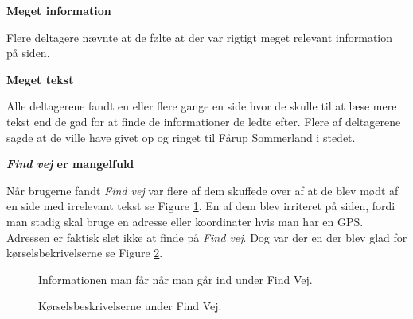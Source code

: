 \documentclass[10pt,a4paper]{article}      %
\newcommand\pic[1]{\texttt{[image: Pics/\#1]}}
\renewcommand\good{\pic{good}}
\renewcommand\smallproblem{\pic{smallproblem}}
\renewcommand\seriousproblem{\pic{seriousproblem}}
\begin{document}
\begin{kommentarer}


\item[\good] \textbf{Meget information}

Flere deltagere nævnte at de følte at der var rigtigt meget relevant information på siden.

\item[\seriousproblem] \textbf{Meget tekst}

Alle deltagerene fandt en eller flere gange en side hvor de skulle til at læse
mere tekst end de gad for at finde de informationer de ledte efter. Flere af
deltagerene sagde at de ville have givet op og ringet til Fårup Sommerland i
stedet.

\item[\smallproblem] \textbf{\emph{Find vej} er mangelfuld}

Når brugerne fandt \emph{Find vej} var flere af dem skuffede over af at de
blev mødt af en side med irrelevant tekst se Figure \ref{fig:findvej}. En af
dem blev irriteret på siden, fordi man stadig skal bruge en adresse eller
koordinater hvis man har en GPS. Adressen er faktisk slet ikke at finde på 
\emph{Find vej}. Dog var der en der blev glad for kørselsbekrivelserne se
Figure \ref{fig:koerselsbeskrivelse}.

\begin{figure}[htbp]
    \centering
    \caption{Informationen man får når man går ind under Find Vej.}
    \label{fig:findvej}
\end{figure}

\begin{figure}[htbp]
    \centering
    \caption{Kørselsbeskrivelserne under Find Vej.}
    \label{fig:koerselsbeskrivelse}
\end{figure}


\end{kommentarer}
\end{document}
